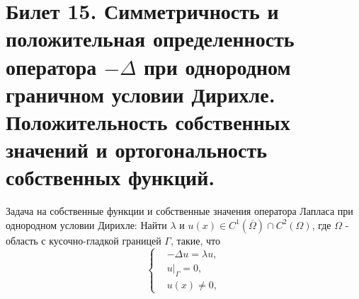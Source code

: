 \section{Билет 15. Симметричность и положительная определенность оператора $-\Delta$ при однородном граничном условии Дирихле. Положительность собственных значений и ортогональность собственных функций.}
Задача на собственные функции и собственные значения оператора Лапласа при однородном условии Дирихле:
Найти $\lambda$ и $u(x) \in C^1(\overline{\Omega}) \cap C^2(\Omega)$, где $\Omega$ - область с кусочно-гладкой границей $\Gamma$, такие, что
\[
\begin{cases}
&- \Delta u= \lambda u,\\
& u|_\Gamma=0,\\
& u(x) \neq 0,
\end{cases} 
\]

